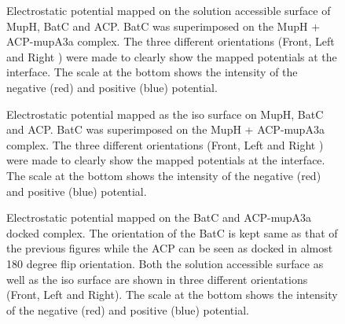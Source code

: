 			\setlength\fboxsep{5pt}
			\setlength\fboxrule{1.5pt}
			\begin{figure} [!]
			\centering
			\caption[Electrostatic potential mapped on the solution accessible surface of MupH, BatC and ACP.]{Electrostatic potential mapped on the solution accessible surface of MupH, BatC and ACP. BatC was superimposed on the MupH + ACP-mupA3a complex. The three different orientations (Front, Left and Right ) were made to clearly show the mapped potentials at the interface. The scale at the bottom shows the intensity of the negative (red) and positive (blue) potential.}
			\label{fig:solsurfmuphbatcacp}
			\end{figure}

			\setlength\fboxsep{5pt}
			\setlength\fboxrule{1.5pt}
			\begin{figure} [!]
			\centering
			\caption[Electrostatic potential mapped as the iso surface on MupH, BatC and ACP.]{Electrostatic potential mapped as the iso surface on MupH, BatC and ACP. BatC was superimposed on the MupH + ACP-mupA3a complex. The three different orientations (Front, Left and Right ) were made to clearly show the mapped potentials at the interface. The scale at the bottom shows the intensity of the negative (red) and positive (blue) potential.}
			\label{fig:isosurfmuphbatcacp}
			\end{figure}

			\setlength\fboxsep{5pt}
			\setlength\fboxrule{1.5pt}
			\begin{figure} [!]
			\centering
			\caption[Electrostatic potential mapped on the BatC and ACP-mupA3a docked complex.]{Electrostatic potential mapped on the BatC and ACP-mupA3a docked complex. The orientation of the BatC is kept same as that of the previous figures while the ACP can be seen as docked in almost 180 degree flip orientation. Both the solution accessible surface as well as the iso surface are shown in three different orientations (Front, Left and Right). The scale at the bottom shows the intensity of the negative (red) and positive (blue) potential.}
			\label{fig:dockedbatcacp}
			\end{figure}
		
